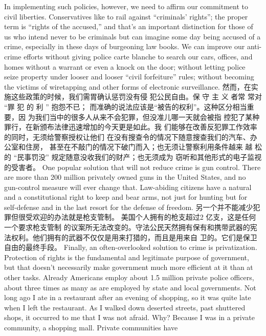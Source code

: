 \begin{paracol}{2}
\switchcolumn*
In implementing such policies, however, we need to affirm
our commitment to civil liberties. Conservatives like to rail
against ``criminals' rights''; the proper term is ``rights of the accused,'' and that's an important distinction for those of us who
intend never to be criminals but can imagine some day being
accused of a crime, especially in these days of burgeoning law
books. We can improve our anti-crime efforts without giving police carte blanche to search our cars, offices, and homes without
a warrant or even a knock on the door; without letting police
seize property under looser and looser ``civil forfeiture'' rules; without becoming the victims of wiretapping and other forms
of electronic surveillance.
\switchcolumn
然而，在实施这些政策的时候，我们需胃确认惩罚没有侵
犯公民自由。保 守 主 义 者常 常对 “罪 犯 的 利 ” 抱怨不已；
而准确的说法应该是“被告的权利”。这种区分相当重要，因
为我们当中的很多人从来不会犯罪，但没准儿哪一天就会被指
控犯了某种罪行，在新颁布法律迅速增加的今天更是如此。我
们能够在改善反犯罪工作效率的同时，无须给警察授权让他们
在没有搜查令的情况下随意搜查我们的汽车、办公室和住房，
甚至在不敲门的情况下破门而入；也无须让警察利用条件越来
越 松 的 “民事罚没” 规定随意没收我们的财产；也无须成为
窃听和其他形式的电子监视的受害者。
\switchcolumn*
One popular solution that will not reduce crime is gun control. There are more than 200 million privately owned guns in
the United States, and no gun-control measure will ever change
that. Law-abiding citizens have a natural and a constitutional
right to keep and bear arms, not just for hunting but for self-defense and in the last resort for the defense of freedom.
\switchcolumn
另一个并不能减少犯罪但很受欢迎的办法就是枪支管制。
美国个人拥有的枪支超过2 亿支，这是任何一个要求枪支管制
的议案所无法改变的。守法公民天然拥有保有和携带武器的宪
法权利。他们拥有的武器不仅仅是用来打猎的，而且是用来自
卫的。它们是保卫自由的最终手段。
\switchcolumn*
Finally, an often-overlooked solution to crime is privatization. Protection of rights is the fundamental and legitimate
purpose of government, but that doesn't necessarily make government much more efficient at it than at other tasks. Already
Americans employ about 1.5 million private police officers,
about three times as many as are employed by state and local
governments. Not long ago I ate in a restaurant after an
evening of shopping, so it was quite late when I left the restaurant. As I walked down deserted streets, past shuttered shops, it
occurred to me that I was not afraid. Why? Because I was in a
private community, a shopping mall. Private communities have

\end{paracol}
